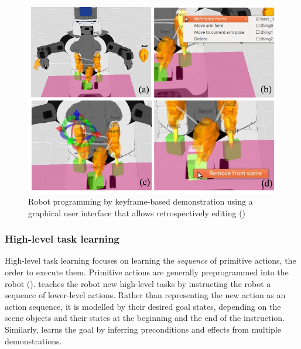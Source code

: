 \begin{figure}[!h]
	\centering
	\includegraphics[width=0.7\linewidth]{figures/alexandrova-gui}
	\caption{Robot programming by keyframe-based demonstration using a graphical user interface that allows retrospectively editing (\cite{alexandrova2014robot})}
	\label{fig:alexandrova-gui}
\end{figure} 

\subsubsection{High-level task learning}\label{ssec:highlevel}
High-level task learning focuses on learning the \textit{sequence} of primitive actions, \ie the order to execute them.
Primitive actions are generally preprogrammed into the robot (\cite{peppoloni2014ros}).
\cite{she2014teaching} teaches the robot new high-level tasks by instructing the robot a sequence of lower-level actions.
Rather than representing the new action as an action sequence, it is modelled by their desired goal states, depending on the scene objects and their states at the beginning and the end of the instruction.
Similarly, \cite{ahmadzadeh2015learning} learns the goal by inferring preconditions and effects from multiple demonstrations.

